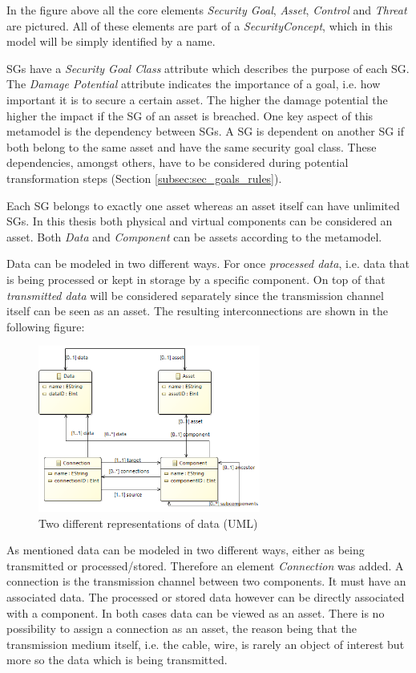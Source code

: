 In the figure above all the core elements \textit{Security Goal}, \textit{Asset}, \textit{Control} and \textit{Threat} are pictured. All of these elements are part of a \textit{SecurityConcept}, which in this model will be simply identified by a name. 

SGs have a \textit{Security Goal Class} attribute which describes the purpose of each SG. The \textit{Damage Potential} attribute indicates the importance of a goal, i.e. how important it is to secure a certain asset. The higher the damage potential the higher the impact if the SG of an asset is breached. One key aspect of this metamodel is the dependency between SGs. A SG is dependent on another SG if both belong to the same asset and have the same security goal class. These dependencies, amongst others, have to be considered during potential transformation steps (Section \ref{subsec:sec_goals_rules}). 

Each SG belongs to exactly one asset whereas an asset itself can have unlimited SGs. In this thesis both physical and virtual components can be considered an asset. Both \textit{Data} and \textit{Component} can be assets according to the metamodel. 

Data can be modeled in two different ways. For once \textit{processed data}, i.e. data that is being processed or kept in storage by a specific component. On top of that \textit{transmitted data} will be considered separately since the transmission channel itself can be seen as an asset. The resulting interconnections are shown in the following figure:

\begin{figure}[H]
\centering
\includegraphics[width=0.65\textwidth]{pictures/two_data.png}
\caption{Two different representations of data (UML)}
\label{fig:data}
\end{figure} 

As mentioned data can be modeled in two different ways, either as being transmitted or processed/stored. Therefore an element \textit{Connection} was added. A connection is the transmission channel between two components. It must have an associated data. The processed or stored data however can be directly associated with a component. In both cases data can be viewed as an asset. There is no possibility to assign a connection as an asset, the reason being that the transmission medium itself, i.e. the cable, wire, is rarely an object of interest but more so the data which is being transmitted.

